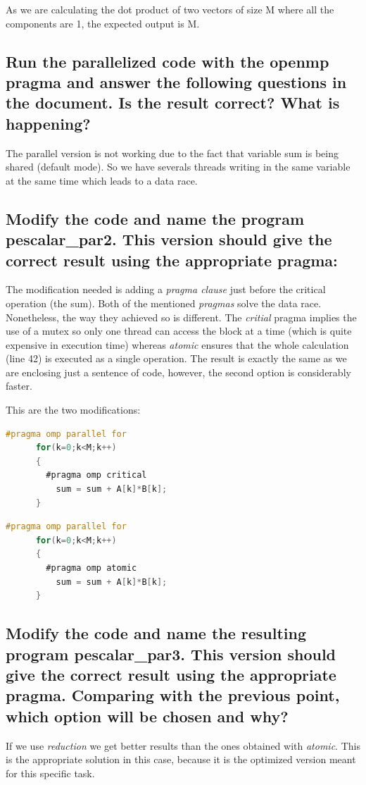 \documentclass{article}
\newcommand{\question}[1]{\subsection{#1}}
\begin{document}
As we are calculating the dot product of two vectors of size M where all the components are 1, the expected output is M.
    
\question{Run the parallelized code with the openmp pragma and answer the following questions in the document. Is the result correct? What is happening?}
    
The parallel version is not working due to the fact that variable sum is being shared (default mode). So we have severals threads writing in the same variable at the same time which leads to a data race.

\question{Modify the code and name the program pescalar\_par2. This version should give the correct result using the appropriate pragma:}

The modification needed is adding a \emph{pragma clause} just before the critical operation (the sum).
Both of the mentioned \emph{pragmas} solve the data race. Nonetheless, the way they achieved so is different. The \emph{critial} pragma implies the use of a mutex so only one thread can access the block at a time (which is quite expensive in execution time) whereas \emph{atomic} ensures that the whole calculation (line 42) is executed as a single operation. The result is exactly the same as we are enclosing just a sentence of code, however, the second option is considerably faster.

This are the two modifications:

\begin{lstlisting}[language=C, texcl=true]
    #pragma omp parallel for 
      for(k=0;k<M;k++)
      {	
        #pragma omp critical
          sum = sum + A[k]*B[k];
      } 
\end{lstlisting}

\begin{lstlisting}[language=C, texcl=true]
    #pragma omp parallel for 
      for(k=0;k<M;k++)
      {	
        #pragma omp atomic
          sum = sum + A[k]*B[k];
      } 
\end{lstlisting}

\question{Modify the code and name the resulting program pescalar\_par3. This version should give the correct result using the appropriate pragma. Comparing with the previous point, which option will be chosen and why?}

If we use \emph{reduction} we get better results than the ones obtained with \emph{atomic}. This is the appropriate solution in this case, because it is the optimized version meant for this specific task.
\end{document}
